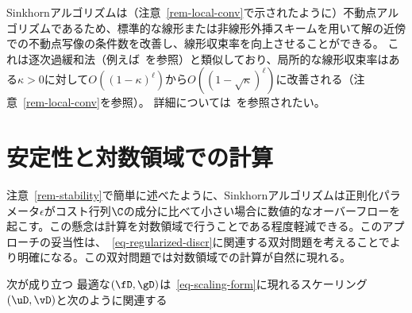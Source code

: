 \begin{rem}[外挿加速]
	Sinkhornアルゴリズムは（注意~\ref{rem-local-conv}で示されたように）不動点アルゴリズムであるため、標準的な線形または非線形外挿スキームを用いて解の近傍での不動点写像の条件数を改善し、線形収束率を向上させることができる。
	これは逐次過緩和法（例えば~\citep{hadjidimos2000successive}を参照）と類似しており、局所的な線形収束率はある$\kappa>0$に対して$O((1-\kappa)^\ell)$から$O((1-\sqrt{\kappa})^\ell)$に改善される（注意~\ref{rem-local-conv}を参照）。
	詳細については~\citep{2016-peyre-qot}を参照されたい。
\end{rem}



\section{安定性と対数領域での計算}

注意~\ref{rem-stability}で簡単に述べたように、Sinkhornアルゴリズムは正則化パラメータ$\epsilon$がコスト行列$\C$の成分に比べて小さい場合に数値的なオーバーフローを起こす。この懸念は計算を対数領域で行うことである程度軽減できる。このアプローチの妥当性は、~\eqref{eq-regularized-discr}に関連する双対問題を考えることでより明確になる。この双対問題では対数領域での計算が自然に現れる。

\begin{prop}
次が成り立つ
%
最適な$(\fD,\gD)$は~\eqref{eq-scaling-form}に現れるスケーリング$(\uD,\vD)$と次のように関連する
\end{prop}

